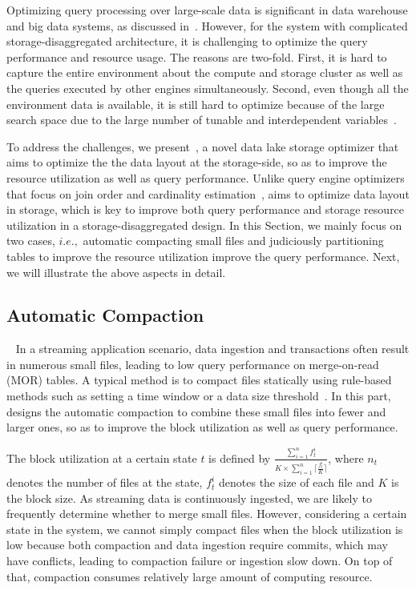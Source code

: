 Optimizing  query processing over large-scale data is significant in data warehouse and big data systems, as discussed in~\cite{}. However, for the \sys system with
complicated storage-disaggregated architecture, it is challenging to optimize the query performance and resource usage. The reasons are two-fold. First, it is hard to capture the entire environment about the compute and storage cluster as well as the queries executed by other engines simultaneously. Second, even though all the environment data is available, it is still hard to optimize because of the large search space due to the large number of tunable and interdependent variables~\cite{}.



To address the challenges, we present~\brain, a novel data lake storage optimizer that aims to optimize the  the data layout at the storage-side, so as to improve the resource utilization as well as  query performance.
Unlike query engine optimizers that focus on join order and cardinality estimation~\cite{}, \brain aims to optimize data layout in storage, which is key to improve both query performance and storage resource utilization in a storage-disaggregated design. In this Section, we mainly focus on two cases, $i.e.,$ automatic compacting small files  and judiciously partitioning tables to improve the resource utilization improve the query performance.
Next, we will illustrate the above aspects in detail.

\subsection{Automatic Compaction}~\label{subsec:compaction}
In a streaming application scenario, data ingestion and transactions often result in numerous small files, leading to low query performance on merge-on-read (MOR) tables. 
A typical method is to compact files statically using rule-based methods such as setting a time window or a data size threshold~\cite{iceberg,hudi}.
In this part, \brain  designs the automatic compaction to combine these small files into fewer and larger ones, so as to  improve the block utilization  as well as query performance.

The block utilization at a certain state $t$ is defined by $\frac{\sum_{i=1}^{n}f_t^i}{K \times  \sum_{i=1}^{n}\lceil \frac{f_t^i}{K}\rceil}$, where $n_t$ denotes the number of files at the state, $f_t^i$ denotes the size of each file and $K$ is the block size.
 As streaming data is continuously ingested,  we are likely to frequently determine whether to merge small files.
  However, considering a certain state in the system, we cannot simply  compact files when the block utilization is low because both compaction and data ingestion require commits, which may have conflicts, leading to compaction failure or ingestion slow down. On top of that, compaction consumes relatively large amount of computing resource. 
  
